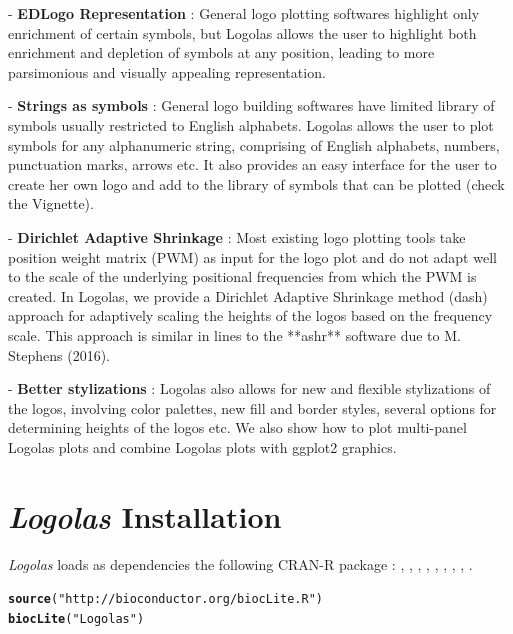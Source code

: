 \documentclass[12pt]{article}\usepackage[]{graphicx}\usepackage[usenames,dvipsnames]{color}
\makeatletter
\newcommand{\hlstr}[1]{\textcolor[rgb]{0.192,0.494,0.8}{#1}}%
\newcommand{\hlstd}[1]{\textcolor[rgb]{0.345,0.345,0.345}{#1}}%
\newcommand{\hlkwd}[1]{\textcolor[rgb]{0.737,0.353,0.396}{\textbf{#1}}}%
\newenvironment{kframe}{%
 \def\at@end@of@kframe{}%
 \ifinner\ifhmode%
  \def\at@end@of@kframe{\end{minipage}}%
  \begin{minipage}{\columnwidth}%
 \fi\fi%
 \def\FrameCommand##1{\hskip\@totalleftmargin \hskip-\fboxsep
 \colorbox{shadecolor}{##1}\hskip-\fboxsep
     \hskip-\linewidth \hskip-\@totalleftmargin \hskip\columnwidth}%
 \MakeFramed {\advance\hsize-\width
   \@totalleftmargin\z@ \linewidth\hsize
   \@setminipage}}%
 {\par\unskip\endMakeFramed%
 \at@end@of@kframe}
\newenvironment{knitrout}{}{} %
\newcommand{\Logolas}{\textit{Logolas}}
\makeatother
\begin{document}
- \textbf{EDLogo Representation} : General logo plotting softwares highlight only enrichment of certain symbols, but Logolas allows the user to highlight both enrichment and depletion of symbols at any position, leading to more parsimonious and visually appealing representation.

- \textbf{Strings as symbols} : General logo building softwares have limited library of symbols usually restricted to English alphabets. Logolas allows the user to plot symbols for any alphanumeric string, comprising of English alphabets, numbers, punctuation marks, arrows etc. It also provides an easy interface for the user to create her own logo and add to the library of symbols that can be plotted (check the Vignette).


- \textbf{Dirichlet Adaptive Shrinkage} : Most existing logo plotting tools take position weight matrix (PWM) as input for the logo plot and do not adapt well to the scale of the underlying positional frequencies from which the PWM is created. In Logolas, we provide a Dirichlet Adaptive Shrinkage method (dash) approach for adaptively scaling the heights of the logos based on the frequency scale. This approach is similar in lines to the **ashr** software due to M. Stephens (2016).


- \textbf{Better stylizations} : Logolas also allows for new and flexible stylizations of the logos, involving color palettes, new fill and border styles, several options for determining heights of the logos etc. We also show how to plot multi-panel Logolas plots and combine Logolas plots with ggplot2 graphics.


\newpage

\section{\Logolas{} Installation}

\Logolas{} loads as dependencies the following CRAN-R package : , , , ,  ,  , , , .

\begin{knitrout}
\color{fgcolor}\begin{kframe}
\begin{alltt}
\hlkwd{source}\hlstd{(}\hlstr{"http://bioconductor.org/biocLite.R"}\hlstd{)}
\hlkwd{biocLite}\hlstd{(}\hlstr{"Logolas"}\hlstd{)}
\end{alltt}
\end{kframe}
\end{knitrout}
\end{document}
